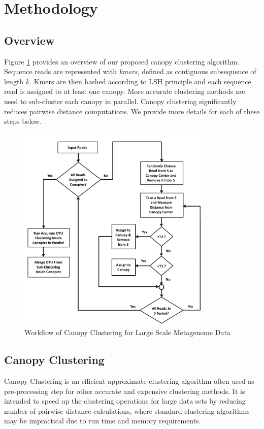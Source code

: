\documentclass[letterpaper,twocolumn]{article}
\begin{document}
\section{Methodology}
\label{sec:Methods}
\subsection{Overview}
Figure \ref{fig:flowchart} provides an overview of our proposed canopy clustering algorithm.  Sequence reads are represented with \textit{kmers}, defined as contiguous subsequence of length $k$. Kmers are then hashed according to LSH principle and each sequence read is assigned to at least one canopy. More accurate clustering methods are used to sub-cluster each canopy in parallel. Canopy clustering significantly reduces pairwise distance computations. We provide more details for each of these steps below.

\begin{figure}
	\centering
	\includegraphics[width=\linewidth,height=10cm]{flowchart.pdf}	
	\caption{Workflow of Canopy Clustering for Large Scale Metagenome Data}
	\label{fig:flowchart}
\end{figure}

\subsection{Canopy Clustering}
Canopy Clustering\cite{MARCanopy} is an efficient 
approximate 
clustering algorithm often used as pre-processing step for other 
accurate and expensive clustering methods. It
is intended to speed up the 
clustering operations for 
large data sets by reducing number of pairwise distance calculations, where standard clustering algorithms may be 
impractical due to  run time and memory requirements. 
\end{document}
